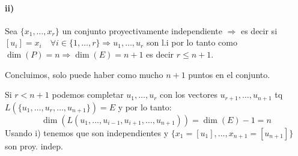 {\paragraph{ii)} Sea $\{x_1, \dots, x_r\}$ un conjunto proyectivamente independiente $\Rightarrow$ es decir si $[u_i] = x_i \quad \forall i \in \{1, \dots, r\} \Rightarrow u_1, \dots, u_r$ son l.i por lo tanto como $\dim(P) = n \Rightarrow \dim(E) = n+1$ es decir $r \le n+1$.

Concluimos, solo puede haber como mucho $n+1$ puntos en el conjunto.

Si $r < n+1$ podemos completar $u_1, \dots, u_r$ con los vectores $u_{r+1}, \dots, u_{n+1}$ tq $L(\{u_1, \dots, u_r, \dots, u_{n+1}\}) = E$ y por lo tanto:
\[ \dim(L(u_1, \dots,u_{i-1},u_{i+1}, \dots, u_{n+1})) = \dim(E) - 1 = n \]
Usando i) tenemos que son independientes y $\{x_1 = [u_1], \dots, x_{n+1} = [u_{n+1}]\}$ son proy. indep.



}

